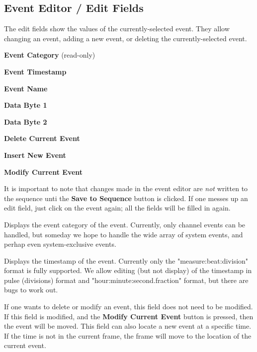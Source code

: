\subsection{Event Editor / Edit Fields}
\label{subsec:seq64_event_editor_fields}

   The edit fields show the values of the currently-selected event.  They allow
   changing an event, adding a new event, or deleting the currently-selected
   event.

   \begin{enumber}
      \item \textbf{Event Category} (read-only)
      \item \textbf{Event Timestamp}
      \item \textbf{Event Name}
      \item \textbf{Data Byte 1}
      \item \textbf{Data Byte 2}
      \item \textbf{Delete Current Event}
      \item \textbf{Insert New Event}
      \item \textbf{Modify Current Event}
   \end{enumber}

   It is important to note that changes made in the event editor
   are \textsl{not} written to the sequence unti the \textbf{Save to Sequence}
   button is clicked.  If one messes up an edit field, just click on the event
   again; all the fields will be filled in again.

   \setcounter{ItemCounter}{0}      %

   Displays the event category of the event.  Currently, only channel events
   can be handled, but someday we hope to handle the wide array of system
   events, and perhap even system-exclusive events.

   Displays the timestamp of the event.  Currently only the
   "measure:beat:division" format is fully supported.
   We allow editing (but not display) of the timestamp in
   pulse (divisions) format and "hour:minute:second.fraction" format, but
   there are bugs to work out.

   If one wants to delete or modify an event, this field does not need to be
   modified.  If this field is modified, and the \textbf{Modify Current Event}
   button is pressed, then the event will be moved.  This field can also locate
   a new event at a specific time.  If the time is not in the current frame,
   the frame will move to the location of the current event.

